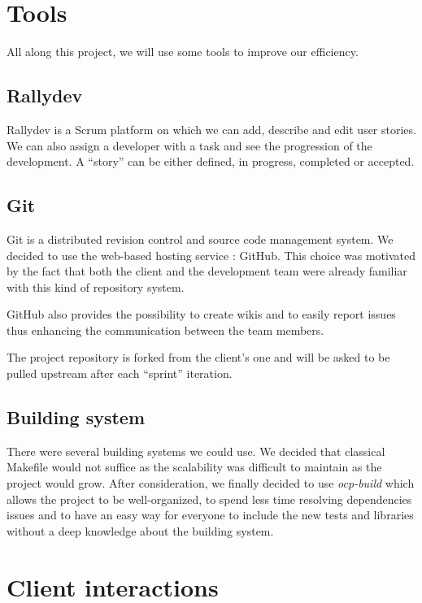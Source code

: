\documentclass[11pt,a4paper]{article}
\begin{document}
\section{Tools}

All along this project, we will use some tools to improve our
efficiency.

\subsection{Rallydev}

Rallydev is a Scrum platform on which we can add, describe and edit
user stories. We can also assign a developer with a task and see the
progression of the development. A ``story'' can be either defined, in
progress, completed or accepted.

\subsection{Git}

Git is a distributed revision control and source code management
system. We decided to use the web-based hosting service : GitHub. This
choice was motivated by the fact that both the client and the
development team were already familiar with this kind of repository
system.

GitHub also provides the possibility to create wikis and to easily
report issues thus enhancing the communication between the team members.

The project repository is forked from the client's one and will be
asked to be pulled upstream after each ``sprint'' iteration.

\subsection{Building system}

There were several building systems we could use. We decided that
classical Makefile would not suffice as the scalability was difficult
to maintain as the project would grow. After consideration, we finally
decided to use \emph{ocp-build} which allows the project to be
well-organized, to spend less time resolving dependencies issues and
to have an easy way for everyone to include the new tests and
libraries without a deep knowledge about the building system.

\section{Client interactions}
\end{document}
